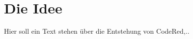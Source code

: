 \chapter{Die Idee}  %
\label{chapter:Die Idee}  %

Hier soll ein Text stehen über die Entstehung von CodeRed,..